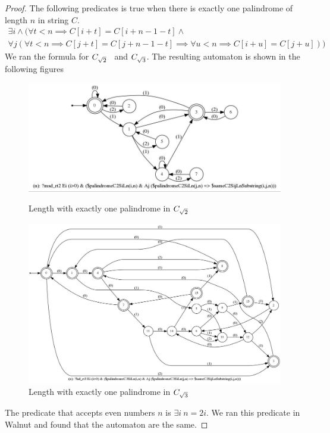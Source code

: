 \begin{proof}
The following predicates is true when there is exactly one palindrome of length $n$ in string $C$. 
\begin{multline*}
    \exists i \wedge (\forall t<n \implies C[i+t] = C[i+n-1-t] \wedge \\
    \forall j (\forall t<n \implies C[j+t] = C[j+n-1-t] \implies \forall u<n \implies C[i+u] = C[j+u]))
\end{multline*}
We ran the formula for $C_{\sqrt{2}}$ ~and $C_{\sqrt{3}}$. The resulting automaton is shown in the following figures

\begin{figure}[h!]
\vspace{10mm}
	\begin{minipage}{0.45\textwidth}
      \centering
      \includegraphics[width=\linewidth]{sturmian_word_paper/paper_images/theorem13_C2.jpg}
      \caption{Length with exactly one palindrome in $C_{\sqrt{2}}$}
      \centering

  	\end{minipage}%
    \hspace{0.05\textwidth}
    \begin{minipage}{0.45\textwidth}
      \centering
      \includegraphics[width=\linewidth]{sturmian_word_paper/paper_images/theorem13_C3.jpg}
      \caption{Length with exactly one palindrome in $C_{\sqrt{3}}$}
      \centering

    \end{minipage}
\end{figure}


The predicate that accepts even numbers $n$ is $\exists i ~n=2i$. We ran this predicate in Walnut and found that the automaton are the same. 
\end{proof}
